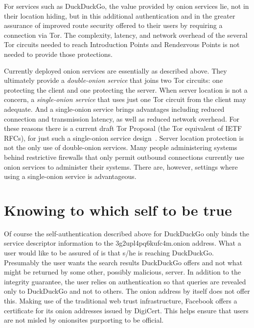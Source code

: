 \documentclass[10pt, conference, compsocconf]{styles/IEEEtran}
\begin{document}

For services such as DuckDuckGo, the value provided by onion services
lie, not in their location hiding, but in this additional
authentication and in the greater assurance of improved route security
offered to their users by requiring a connection via Tor. The
complexity, latency, and network overhead of the several Tor circuits
needed to reach Introduction Points and Rendezvous Points is not needed
to provide those protections.

Currently deployed onion services are essentially as described above.
They ultimately provide a \emph{double-onion service} that joins two
Tor circuits: one protecting the client and one protecting the
server. When server location is not a concern, a \emph{single-onion
  service} that uses just one Tor circuit from the client may
adequate.  And a single-onion service brings advantages including
reduced connection and transmission latency, as well as reduced
network overhead. For these reasons there is a current draft Tor
Proposal (the Tor equivalent of IETF RFCs), for just such a
single-onion service design~\cite{single-onion-proposal}. Server
location protection is not the only use of double-onion services. Many
people administering systems behind restrictive firewalls that only
permit outbound connections currently use onion services to administer
their systems. There are, however, settings where using a single-onion
service is advantageous.

\section{Knowing to which self to be true}

Of course the self-authentication described above 
for DuckDuckGo only binds the
service descriptor information to the 3g2upl4pq6kufc4m.onion
address. What a user would like to be assured of is that s/he is
reaching DuckDuckGo. Presumably the user wants the search results
DuckDuckGo offers and not what might be returned by some other,
possibly malicious, server.  In addition to the integrity guarantee,
the user relies on authentication so that queries are revealed only to
DuckDuckGo and not to others. The onion address by itself does not
offer this. Making use of the traditional web trust infrastructure,
Facebook offers a certificate for its onion addresses
issued by DigiCert.  This helps ensure that users are not misled by
onionsites purporting to be official.
\end{document}
